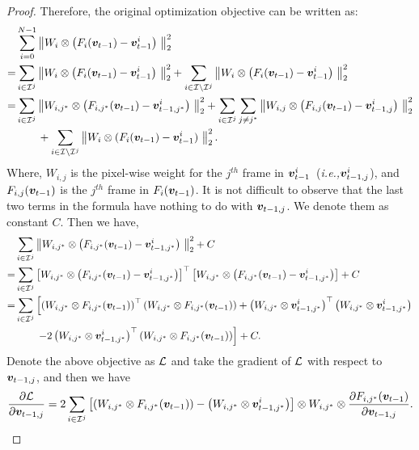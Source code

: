 \documentclass{article}
\newtheorem{proof}{Proof}[section]
\def\ie{\emph{i.e.,}}
\begin{document}
\begin{proof}
Therefore, the original optimization objective can be written as:
\begin{align*}
     & \sum_{i=0}^{N-1}\left\|W_i \otimes \left(F_i({\bm{v}}_{t-1})-{\bm{v}}_{t-1}^i\right)\ \right\|_2^2 \\
    = & 
    \sum_{i\in {\mathcal{I}}^j}\left\|W_i \otimes \left(F_i({\bm{v}}_{t-1})-{\bm{v}}_{t-1}^i\right)\ \right\|_2^2  + \sum_{i\in {\mathcal{I}} \setminus {\mathcal{I}}^j}\left\|W_i \otimes \left(F_i({\bm{v}}_{t-1})-{\bm{v}}_{t-1}^i\right)\ \right\|_2^2 \\
     = & 
    \sum_{i\in {\mathcal{I}}^j}\left\|W_{i,j^*} \otimes \left(F_{i,j^*}({\bm{v}}_{t-1})-{\bm{v}}_{t-1,j^*}^i\right)\ \right\|_2^2  + \sum_{i\in {\mathcal{I}}^j}\sum_{j\not=j^*}\left\|W_{i,j} \otimes \left(F_{i,j}({\bm{v}}_{t-1})-{\bm{v}}_{t-1,j}^i\right)\ \right\|_2^2 \\   & \qquad + \sum_{i\in {\mathcal{I}} \setminus {\mathcal{I}}^j}\left\|W_i \otimes (F_i({\bm{v}}_{t-1})-{\bm{v}}_{t-1}^i)\ \right\|_2^2 .
\end{align*} 
Where, $W_{i,j}$ is the pixel-wise weight for the $j^{th}$ frame in ${\bm{v}}^i_{t-1}$~(\ie ${\bm{v}}_{t-1,j}^i$), and $F_{i,j}({\bm{v}}_{t-1})$ is the $j^{th}$ frame in $F_{i}({\bm{v}}_{t-1})$. It is not difficult to observe that the last two terms in the formula have nothing to do with ${\bm{v}}_{t-1,j}$.  We denote them as constant $C$. Then we have,
\begin{align*}
     & \sum_{i\in {\mathcal{I}}^j}\left\|W_{i,j^*} \otimes \left(F_{i,j^*}({\bm{v}}_{t-1})-{\bm{v}}_{t-1,j^*}^i\right)\ \right\|_2^2  + C \\
     = & \sum_{i\in {\mathcal{I}}^j}\left[  W_{i,j^*} \otimes \left(F_{i,j^*}({\bm{v}}_{t-1})-{\bm{v}}_{t-1,j^*}^i \right)\right]^\top \left[  W_{i,j^*} \otimes \left(F_{i,j^*}({\bm{v}}_{t-1})-{\bm{v}}_{t-1,j^*}^i \right)\right]+C  \\
     = & \sum_{i\in {\mathcal{I}}^j} \left[\left(W_{i,j^*} \otimes F_{i,j^*}({\bm{v}}_{t-1}) \right)^\top \left(W_{i,j^*} \otimes F_{i,j^*}({\bm{v}}_{t-1}) \right)  + \left(W_{i,j^*} \otimes {\bm{v}}_{t-1,j^*}^i\right)^\top \left(W_{i,j^*} \otimes {\bm{v}}_{t-1,j^*}^i\right) \right.\\ &\qquad \left. -2 \left(W_{i,j^*} \otimes {\bm{v}}_{t-1,j^*}^i\right)^\top\left(W_{i,j^*} \otimes F_{i,j^*}({\bm{v}}_{t-1}) \right)  \right]+ C.
\end{align*}
Denote the above objective as ${\mathcal{L}}$ and take the gradient of ${\mathcal{L}}$ with respect to ${\bm{v}}_{t-1,j}$, and then we have
\begin{align*}
\frac{\partial \gL}{\partial \vv_{t-1,j}} = 2 \sum_{i\in \gI^j}\left[  \left(W_{i,j^*} \otimes F_{i,j^*}(\vv_{t-1})\right)-\left(W_{i,j^*} \otimes \vv_{t-1,j^*}^i\right)\right] \otimes W_{i,j^*}\otimes \frac{\partial F_{i,j^*}(\vv_{t-1})}{\partial \vv_{t-1,j}}.

\end{align*}
\end{proof}
\end{document}
